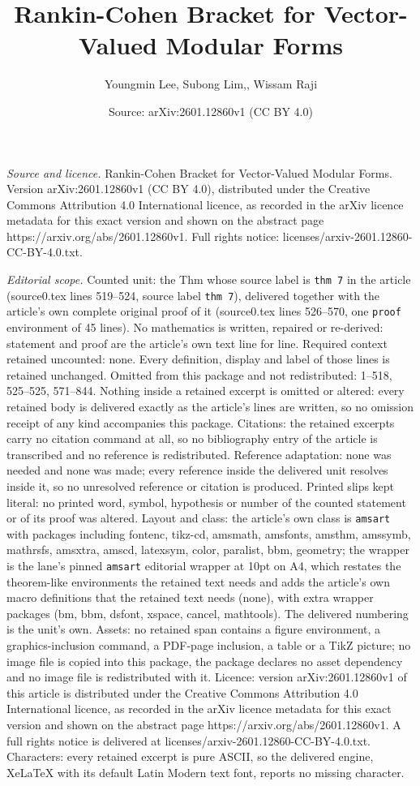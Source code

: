 \documentclass[10pt,a4paper]{amsart}
\title[Rankin-Cohen Bracket for Vector-Valued Modular Forms]{Rankin-Cohen Bracket for Vector-Valued Modular Forms}
\author{Youngmin Lee, Subong Lim,, Wissam Raji}
\date{Source: arXiv:2601.12860v1 (CC BY 4.0)}
\begin{document}
\maketitle

\noindent\emph{Source and licence.} Rankin-Cohen Bracket for Vector-Valued Modular Forms. Version arXiv:2601.12860v1 (CC BY 4.0), distributed under the Creative Commons Attribution 4.0 International licence, as recorded in the arXiv licence metadata for this exact version and shown on the abstract page https://arxiv.org/abs/2601.12860v1. Full rights notice: licenses/arxiv-2601.12860-CC-BY-4.0.txt.\par\smallskip

\noindent\textit{Editorial scope.} Counted unit: the Thm whose source label is \texttt{thm 7} in the article (source0.tex lines 519--524, source label \texttt{thm 7}), delivered together with the article's own complete original proof of it (source0.tex lines 526--570, one \texttt{proof} environment of 45 lines). No mathematics is written, repaired or re-derived: statement and proof are the article's own text line for line. Required context retained uncounted: none. Every definition, display and label of those lines is retained unchanged. Omitted from this package and not redistributed: 1--518, 525--525, 571--844. Nothing inside a retained excerpt is omitted or altered: every retained body is delivered exactly as the article's lines are written, so no omission receipt of any kind accompanies this package. Citations: the retained excerpts carry no citation command at all, so no bibliography entry of the article is transcribed and no reference is redistributed. Reference adaptation: none was needed and none was made; every reference inside the delivered unit resolves inside it, so no unresolved reference or citation is produced. Printed slips kept literal: no printed word, symbol, hypothesis or number of the counted statement or of its proof was altered. Layout and class: the article's own class is \texttt{amsart} with packages including fontenc, tikz-cd, amsmath, amsfonts, amsthm, amssymb, mathrsfs, amsxtra, amscd, latexsym, color, paralist, bbm, geometry; the wrapper is the lane's pinned \texttt{amsart} editorial wrapper at 10pt on A4, which restates the theorem-like environments the retained text needs and adds the article's own macro definitions that the retained text needs (none), with extra wrapper packages (bm, bbm, dsfont, xspace, cancel, mathtools). The delivered numbering is the unit's own. Assets: no retained span contains a figure environment, a graphics-inclusion command, a PDF-page inclusion, a table or a TikZ picture; no image file is copied into this package, the package declares no asset dependency and no image file is redistributed with it. Licence: version arXiv:2601.12860v1 of this article is distributed under the Creative Commons Attribution 4.0 International licence, as recorded in the arXiv licence metadata for this exact version and shown on the abstract page https://arxiv.org/abs/2601.12860v1. A full rights notice is delivered at licenses/arxiv-2601.12860-CC-BY-4.0.txt. Characters: every retained excerpt is pure ASCII, so the delivered engine, XeLaTeX with its default Latin Modern text font, reports no missing character.
\end{document}
